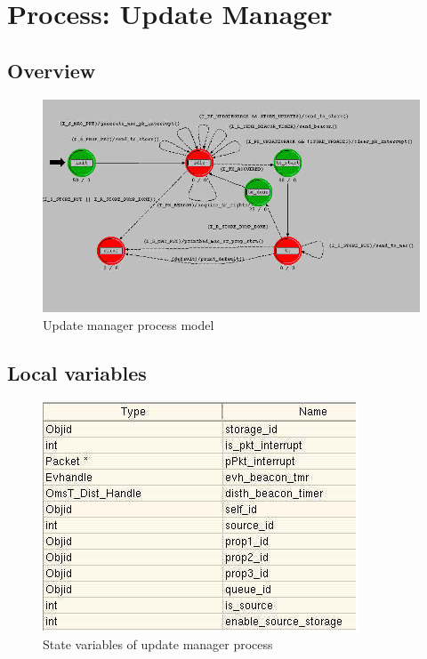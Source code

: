 
\section{Process: Update Manager}

\subsection{Overview}
\begin{figure}[ht]
    \centering
    \includegraphics[width=.7\textwidth]{images/p_update_manager}
    \caption{Update manager process model}
    \label{fig:appendix-c}
\end{figure}

\subsection{Local variables}
\begin{figure}[ht]
    \centering
    \includegraphics[width=.7\textwidth]{images/state_variable_update_manager}
    \caption{State variables of update manager process}
    \label{fig:appendix-c_sv}
\end{figure}

